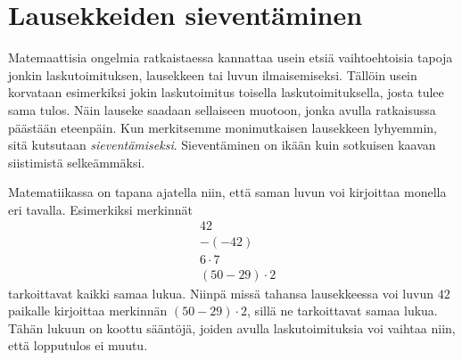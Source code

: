     
    


\section{Lausekkeiden sieventäminen}

Matemaattisia ongelmia ratkaistaessa kannattaa usein etsiä vaihtoehtoisia tapoja jonkin laskutoimituksen, lausekkeen tai luvun ilmaisemiseksi. Tällöin usein korvataan esimerkiksi jokin laskutoimitus toisella laskutoimituksella, josta tulee sama tulos. Näin lauseke saadaan sellaiseen muotoon, jonka avulla ratkaisussa päästään eteenpäin. Kun merkitsemme monimutkaisen lausekkeen lyhyemmin, sitä kutsutaan \emph{sieventämiseksi}. Sieventäminen on ikään kuin sotkuisen kaavan siistimistä selkeämmäksi.

Matematiikassa on tapana ajatella niin, että saman luvun voi kirjoittaa monella eri tavalla. Esimerkiksi merkinnät \begin{align*}
                & 42 \\ & -(-42) \\ & 6 \cdot 7 \\ & (50-29) \cdot 2                                                                                                      
                                                                                                                 \end{align*}
tarkoittavat kaikki samaa lukua. Niinpä missä tahansa lausekkeessa voi luvun $42$ paikalle kirjoittaa merkinnän $(50-29)\cdot 2$, sillä ne tarkoittavat samaa lukua. Tähän lukuun on koottu sääntöjä, joiden avulla laskutoimituksia voi vaihtaa niin, että lopputulos ei muutu.


